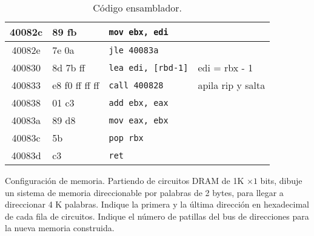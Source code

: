 \documentclass[12pt]{article}
\begin{document}
\begin{ejercicio}[1.25 puntos]
\begin{table}[H]
\begin{tabular}{|c|l|l|l|}
            \hline
            40082c & 89 fb & \verb|mov ebx, edi| & \\
            \hline
            40082e & 7e 0a & \verb|jle 40083a| & \\
            \hline
            400830 & 8d 7b ff & \verb|lea edi, [rbd-1]| & edi = rbx - 1 \\
            \hline
            400833 & e8 f0 ff ff ff & \verb|call 400828| & apila rip y salta\\
            \hline
            400838 & 01 c3 & \verb|add ebx, eax| & \\
            \hline
            40083a & 89 d8 & \verb|mov eax, ebx| & \\
            \hline
            40083c & 5b & \verb|pop rbx| & \\
            \hline
            40083d & c3 & \verb|ret| & \\
            \hline
        \end{tabular}
        \caption{Código ensamblador.}
        \label{tab:sum_asm}
        \end{table}
    \end{ejercicio}
    \begin{ejercicio}[0.75 puntos]
        Configuración de memoria. Partiendo de circuitos DRAM de 1K $\times 1$ bits, dibuje un sistema de memoria direccionable por palabras de 2 bytes, para llegar a direccionar 4 K palabras. Indique la primera y la última dirección en hexadecimal de cada fila de circuitos. Indique el número de patillas del bus de direcciones para la nueva memoria construida.
    \end{ejercicio}
\end{document}
